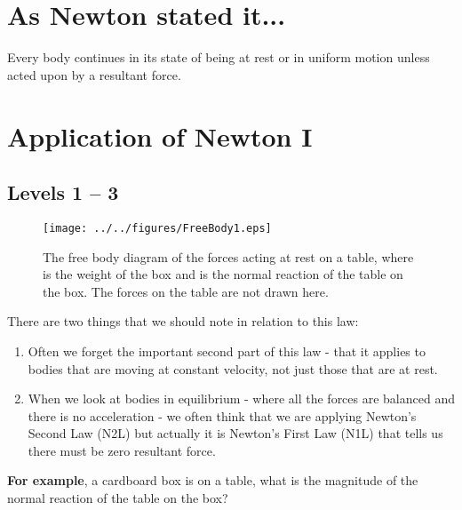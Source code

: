 




\addtolength{\topmargin}{-0.6 cm}
\setlength{\columnsep}{22pt}

\section{As Newton stated it...}

Every body continues in its state of being at rest or in uniform motion unless acted upon by a resultant force.

\setlength{\columnsep}{22pt}
\section{Application of Newton I}
\subsection*{Levels 1 -- 3}
\begin{wrapfigure}{r}{6cm}
\vspace{-3.0cm}
\center
\texttt{[image: ../../figures/FreeBody1.eps]}
\caption{The free body diagram of the forces acting  at rest on a table, where  is the weight of the box and  is the normal reaction of the table on the box.  The forces on the table are not drawn here.}\vspace{-3.5cm}
\end{wrapfigure}

There are two things that we should note in relation to this law:
\begin{enumerate}
\item Often we forget the important second part of this law - that it applies to bodies that are moving at constant velocity, not just those that are at rest.   

\item When we look at bodies in equilibrium - where all the forces are balanced and there is no acceleration - we often think that we are applying Newton's Second Law (N2L) but actually it is Newton's First Law (N1L) that tells us there must be zero resultant force.

\end{enumerate}
{\bf For example}, a cardboard box is  on a table, what is the magnitude of the normal reaction of the table on the box? \\

